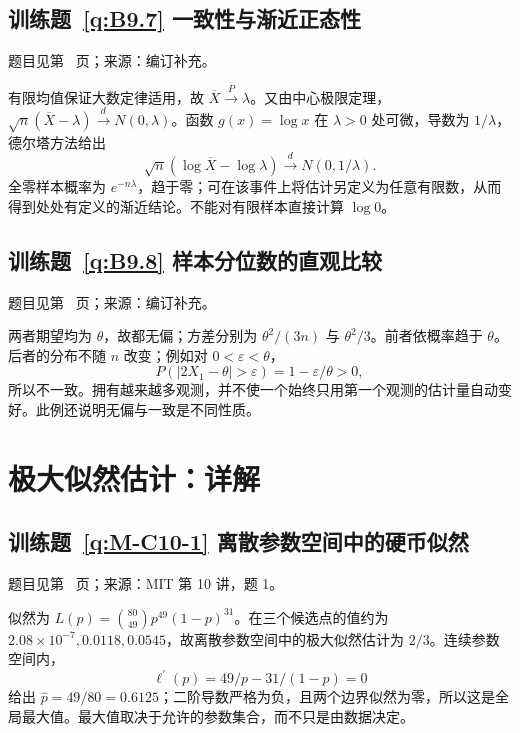 \subsection*{训练题~\ref{q:B9.7} 一致性与渐近正态性}\label{a:B9.7}{\small 题目见第~\pageref{q:B9.7} 页；来源：编订补充。}
\begin{solve}有限均值保证大数定律适用，故 $\overline X\xrightarrow{P}\lambda$。又由中心极限定理，$\sqrt n(\overline X-\lambda)\xrightarrow{d}N(0,\lambda)$。函数 $g(x)=\log x$ 在 $\lambda>0$ 处可微，导数为 $1/\lambda$，德尔塔方法给出\[\sqrt n(\log\overline X-\log\lambda)\xrightarrow{d}N(0,1/\lambda).\]全零样本概率为 $e^{-n\lambda}$，趋于零；可在该事件上将估计另定义为任意有限数，从而得到处处有定义的渐近结论。不能对有限样本直接计算 $\log0$。\end{solve}

\subsection*{训练题~\ref{q:B9.8} 样本分位数的直观比较}\label{a:B9.8}{\small 题目见第~\pageref{q:B9.8} 页；来源：编订补充。}
\begin{solve}两者期望均为 $\theta$，故都无偏；方差分别为 $\theta^2/(3n)$ 与 $\theta^2/3$。前者依概率趋于 $\theta$。后者的分布不随 $n$ 改变；例如对 $0<\varepsilon<\theta$，\[P(|2X_1-\theta|>\varepsilon)=1-\varepsilon/\theta>0,\]所以不一致。拥有越来越多观测，并不使一个始终只用第一个观测的估计量自动变好。此例还说明无偏与一致是不同性质。\end{solve}

\clearpage\section*{极大似然估计：详解}

\subsection*{训练题~\ref{q:M-C10-1} 离散参数空间中的硬币似然}\label{a:M-C10-1}{\small 题目见第~\pageref{q:M-C10-1} 页；来源：MIT 第 10 讲，题 1。}
\begin{solve}似然为 $L(p)=\binom{80}{49}p^{49}(1-p)^{31}$。在三个候选点的值约为 $2.08\times10^{-7},0.0118,0.0545$，故离散参数空间中的极大似然估计为 $2/3$。连续参数空间内，\[\ell^{\prime}(p)=49/p-31/(1-p)=0\]给出 $\widehat p=49/80=0.6125$；二阶导数严格为负，且两个边界似然为零，所以这是全局最大值。最大值取决于允许的参数集合，而不只是由数据决定。\end{solve}

